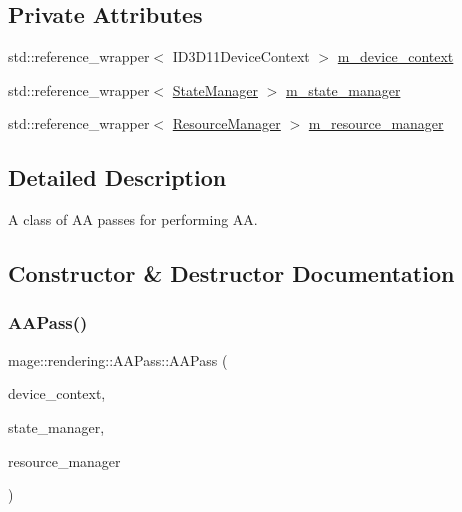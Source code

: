 \subsection*{Private Attributes}
\begin{DoxyCompactItemize}
\item 
std\+::reference\+\_\+wrapper$<$ I\+D3\+D11\+Device\+Context $>$ \hyperlink{classmage_1_1rendering_1_1_a_a_pass_ae5421af4d2de6128ae24f4c6d5179c81}{m\+\_\+device\+\_\+context}
\item 
std\+::reference\+\_\+wrapper$<$ \hyperlink{classmage_1_1rendering_1_1_state_manager}{State\+Manager} $>$ \hyperlink{classmage_1_1rendering_1_1_a_a_pass_a7fea13d1b4462ef4b9b1f6d82ce5aac4}{m\+\_\+state\+\_\+manager}
\item 
std\+::reference\+\_\+wrapper$<$ \hyperlink{classmage_1_1rendering_1_1_resource_manager}{Resource\+Manager} $>$ \hyperlink{classmage_1_1rendering_1_1_a_a_pass_aaffba9ba685e4723220a6c04834f6d2f}{m\+\_\+resource\+\_\+manager}
\end{DoxyCompactItemize}


\subsection{Detailed Description}
A class of AA passes for performing AA. 

\subsection{Constructor \& Destructor Documentation}
\hypertarget{classmage_1_1rendering_1_1_a_a_pass_a691e1f111a4a28b0b734018551c6f418}{}\label{classmage_1_1rendering_1_1_a_a_pass_a691e1f111a4a28b0b734018551c6f418} 
\subsubsection{\texorpdfstring{A\+A\+Pass()}{AAPass()}\hspace{0.1cm}{\footnotesize\ttfamily [1/3]}}
{\footnotesize\ttfamily mage\+::rendering\+::\+A\+A\+Pass\+::\+A\+A\+Pass (\begin{DoxyParamCaption}\item[{I\+D3\+D11\+Device\+Context \&}]{device\+\_\+context,  }\item[{\hyperlink{classmage_1_1rendering_1_1_state_manager}{State\+Manager} \&}]{state\+\_\+manager,  }\item[{\hyperlink{classmage_1_1rendering_1_1_resource_manager}{Resource\+Manager} \&}]{resource\+\_\+manager }\end{DoxyParamCaption})\hspace{0.3cm}{\ttfamily [explicit]}}

